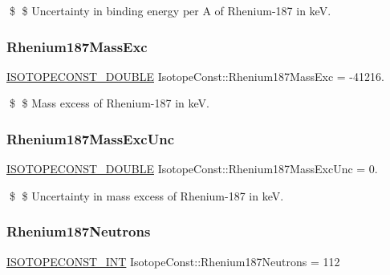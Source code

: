 \$ \$ Uncertainty in binding energy per A of Rhenium-\/187 in keV. \mbox{\label{group___isotope_const-_rhenium-_re187_ga0a7bd0c09697a38c1a86a8f900cbb7fc}} 
\subsubsection{\texorpdfstring{Rhenium187\+Mass\+Exc}{Rhenium187MassExc}}
{\footnotesize\ttfamily \mbox{\hyperlink{group___isotope_const-_macros_ga8f45a7272ce02c0b4c65c44636ed719a}{I\+S\+O\+T\+O\+P\+E\+C\+O\+N\+S\+T\+\_\+\+D\+O\+U\+B\+LE}} Isotope\+Const\+::\+Rhenium187\+Mass\+Exc = -\/41216.}

\$ \$ Mass excess of Rhenium-\/187 in keV. \mbox{\label{group___isotope_const-_rhenium-_re187_gaf3d7bf3bd148f79b190bd8b75c37f741}} 
\subsubsection{\texorpdfstring{Rhenium187\+Mass\+Exc\+Unc}{Rhenium187MassExcUnc}}
{\footnotesize\ttfamily \mbox{\hyperlink{group___isotope_const-_macros_ga8f45a7272ce02c0b4c65c44636ed719a}{I\+S\+O\+T\+O\+P\+E\+C\+O\+N\+S\+T\+\_\+\+D\+O\+U\+B\+LE}} Isotope\+Const\+::\+Rhenium187\+Mass\+Exc\+Unc = 0.}

\$ \$ Uncertainty in mass excess of Rhenium-\/187 in keV. \mbox{\label{group___isotope_const-_rhenium-_re187_gaefe39668b7b29cd929ebf2ede3fe37e4}} 
\subsubsection{\texorpdfstring{Rhenium187\+Neutrons}{Rhenium187Neutrons}}
{\footnotesize\ttfamily \mbox{\hyperlink{group___isotope_const-_macros_ga5f18360b3e99483a35c32d789e62621c}{I\+S\+O\+T\+O\+P\+E\+C\+O\+N\+S\+T\+\_\+\+I\+NT}} Isotope\+Const\+::\+Rhenium187\+Neutrons = 112}

